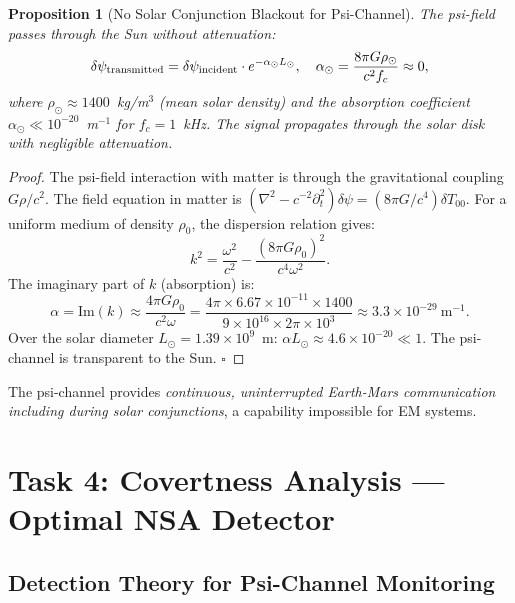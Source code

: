 \documentclass[aps,prd,twocolumn,superscriptaddress,nofootinbib]{revtex4-2}
\newtheorem{proposition}[theorem]{Proposition}
\begin{document}
\begin{proposition}[No Solar Conjunction Blackout for Psi-Channel]
The psi-field passes through the Sun without attenuation:
\begin{equation}
\delta\psi_{\rm transmitted} = \delta\psi_{\rm incident} \cdot e^{-\alpha_\odot L_\odot},
\quad \alpha_\odot = \frac{8\pi G \rho_\odot}{c^2 f_c} \approx 0,
\end{equation}
where $\rho_\odot \approx 1400$~kg/m$^3$ (mean solar density) and
the absorption coefficient $\alpha_\odot \ll 10^{-20}$~m$^{-1}$
for $f_c = 1$~kHz. The signal propagates through the solar disk
with negligible attenuation.
\end{proposition}

\begin{proof}
The psi-field interaction with matter is through the gravitational coupling
$G\rho/c^2$. The field equation in matter is
$(\nabla^2 - c^{-2}\partial_t^2)\delta\psi = (8\pi G/c^4)\delta T_{00}$.
For a uniform medium of density $\rho_0$, the dispersion relation gives:
\begin{equation}
k^2 = \frac{\omega^2}{c^2} - \frac{(8\pi G \rho_0)^2}{c^4 \omega^2}.
\end{equation}
The imaginary part of $k$ (absorption) is:
\begin{equation}
\alpha = \mathrm{Im}(k) \approx \frac{4\pi G \rho_0}{c^2 \omega}
= \frac{4\pi \times 6.67\times10^{-11} \times 1400}{9\times10^{16} \times 2\pi\times10^3}
\approx 3.3\times10^{-29}~\text{m}^{-1}.
\end{equation}
Over the solar diameter $L_\odot = 1.39\times10^9$~m:
$\alpha L_\odot \approx 4.6\times10^{-20} \ll 1$.
The psi-channel is transparent to the Sun. $\square$
\end{proof}

The psi-channel provides \emph{continuous, uninterrupted Earth-Mars
communication including during solar conjunctions}, a capability
impossible for EM systems.

\section{Task 4: Covertness Analysis --- Optimal NSA Detector}
\label{sec:covert-analysis}

\subsection{Detection Theory for Psi-Channel Monitoring}
\end{document}
